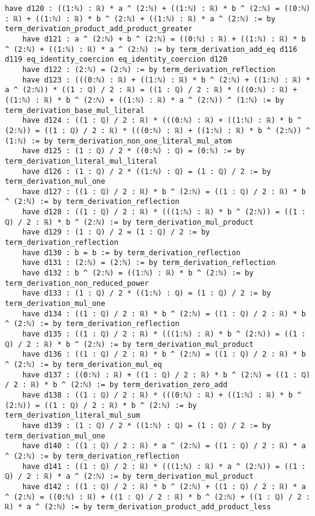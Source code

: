 \documentclass{article}
\begin{document}
\begin{tcolorbox}[colback=white!10, width=\linewidth]
\begin{lstlisting}[language=Lean4]
    have d120 : ((1:ℕ) : ℝ) * a ^ (2:ℕ) + ((1:ℕ) : ℝ) * b ^ (2:ℕ) = ((0:ℕ) : ℝ) + ((1:ℕ) : ℝ) * b ^ (2:ℕ) + ((1:ℕ) : ℝ) * a ^ (2:ℕ) := by term_derivation_product_add_product_greater
    have d121 : a ^ (2:ℕ) + b ^ (2:ℕ) = ((0:ℕ) : ℝ) + ((1:ℕ) : ℝ) * b ^ (2:ℕ) + ((1:ℕ) : ℝ) * a ^ (2:ℕ) := by term_derivation_add_eq d116 d119 eq_identity_coercion eq_identity_coercion d120
    have d122 : (2:ℕ) = (2:ℕ) := by term_derivation_reflection
    have d123 : (((0:ℕ) : ℝ) + ((1:ℕ) : ℝ) * b ^ (2:ℕ) + ((1:ℕ) : ℝ) * a ^ (2:ℕ)) * ((1 : ℚ) / 2 : ℝ) = ((1 : ℚ) / 2 : ℝ) * (((0:ℕ) : ℝ) + ((1:ℕ) : ℝ) * b ^ (2:ℕ) + ((1:ℕ) : ℝ) * a ^ (2:ℕ)) ^ (1:ℕ) := by term_derivation_base_mul_literal
    have d124 : ((1 : ℚ) / 2 : ℝ) * (((0:ℕ) : ℝ) + ((1:ℕ) : ℝ) * b ^ (2:ℕ)) = ((1 : ℚ) / 2 : ℝ) * (((0:ℕ) : ℝ) + ((1:ℕ) : ℝ) * b ^ (2:ℕ)) ^ (1:ℕ) := by term_derivation_non_one_literal_mul_atom
    have d125 : (1 : ℚ) / 2 * ((0:ℕ) : ℚ) = (0:ℕ) := by term_derivation_literal_mul_literal
    have d126 : (1 : ℚ) / 2 * ((1:ℕ) : ℚ) = (1 : ℚ) / 2 := by term_derivation_mul_one
    have d127 : ((1 : ℚ) / 2 : ℝ) * b ^ (2:ℕ) = ((1 : ℚ) / 2 : ℝ) * b ^ (2:ℕ) := by term_derivation_reflection
    have d128 : ((1 : ℚ) / 2 : ℝ) * (((1:ℕ) : ℝ) * b ^ (2:ℕ)) = ((1 : ℚ) / 2 : ℝ) * b ^ (2:ℕ) := by term_derivation_mul_product
    have d129 : (1 : ℚ) / 2 = (1 : ℚ) / 2 := by term_derivation_reflection
    have d130 : b = b := by term_derivation_reflection
    have d131 : (2:ℕ) = (2:ℕ) := by term_derivation_reflection
    have d132 : b ^ (2:ℕ) = ((1:ℕ) : ℝ) * b ^ (2:ℕ) := by term_derivation_non_reduced_power
    have d133 : (1 : ℚ) / 2 * ((1:ℕ) : ℚ) = (1 : ℚ) / 2 := by term_derivation_mul_one
    have d134 : ((1 : ℚ) / 2 : ℝ) * b ^ (2:ℕ) = ((1 : ℚ) / 2 : ℝ) * b ^ (2:ℕ) := by term_derivation_reflection
    have d135 : ((1 : ℚ) / 2 : ℝ) * (((1:ℕ) : ℝ) * b ^ (2:ℕ)) = ((1 : ℚ) / 2 : ℝ) * b ^ (2:ℕ) := by term_derivation_mul_product
    have d136 : ((1 : ℚ) / 2 : ℝ) * b ^ (2:ℕ) = ((1 : ℚ) / 2 : ℝ) * b ^ (2:ℕ) := by term_derivation_mul_eq
    have d137 : ((0:ℕ) : ℝ) + ((1 : ℚ) / 2 : ℝ) * b ^ (2:ℕ) = ((1 : ℚ) / 2 : ℝ) * b ^ (2:ℕ) := by term_derivation_zero_add
    have d138 : ((1 : ℚ) / 2 : ℝ) * (((0:ℕ) : ℝ) + ((1:ℕ) : ℝ) * b ^ (2:ℕ)) = ((1 : ℚ) / 2 : ℝ) * b ^ (2:ℕ) := by term_derivation_literal_mul_sum
    have d139 : (1 : ℚ) / 2 * ((1:ℕ) : ℚ) = (1 : ℚ) / 2 := by term_derivation_mul_one
    have d140 : ((1 : ℚ) / 2 : ℝ) * a ^ (2:ℕ) = ((1 : ℚ) / 2 : ℝ) * a ^ (2:ℕ) := by term_derivation_reflection
    have d141 : ((1 : ℚ) / 2 : ℝ) * (((1:ℕ) : ℝ) * a ^ (2:ℕ)) = ((1 : ℚ) / 2 : ℝ) * a ^ (2:ℕ) := by term_derivation_mul_product
    have d142 : ((1 : ℚ) / 2 : ℝ) * b ^ (2:ℕ) + ((1 : ℚ) / 2 : ℝ) * a ^ (2:ℕ) = ((0:ℕ) : ℝ) + ((1 : ℚ) / 2 : ℝ) * b ^ (2:ℕ) + ((1 : ℚ) / 2 : ℝ) * a ^ (2:ℕ) := by term_derivation_product_add_product_less

\end{lstlisting}
\end{tcolorbox}
\end{document}
